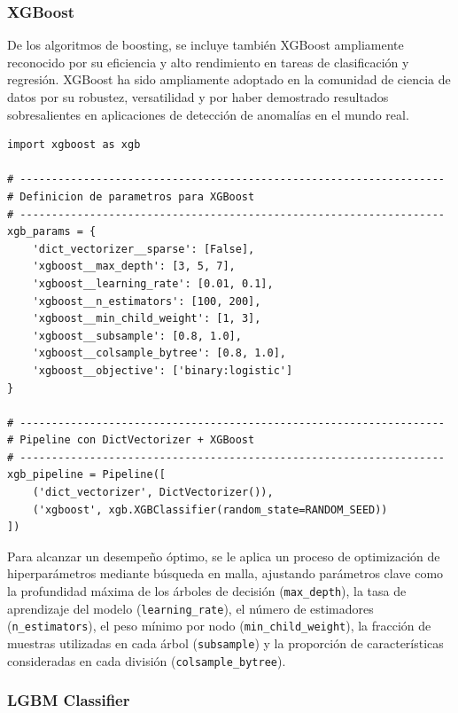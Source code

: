\documentclass[11pt,a4paper,spanish]{book}
\numberwithin{equation}{chapter}
\numberwithin{figure}{chapter}
\begin{document}
\subsubsection{XGBoost}

De los algoritmos de boosting, se incluye también XGBoost ampliamente reconocido por su eficiencia y alto rendimiento en tareas de clasificación y regresión. XGBoost ha sido ampliamente adoptado en la comunidad de ciencia de datos por su robustez, versatilidad y por haber demostrado resultados sobresalientes en aplicaciones de detección de anomalías en el mundo real.


\vspace{5mm}
\begin{lstlisting}
import xgboost as xgb

# -------------------------------------------------------------------
# Definicion de parametros para XGBoost
# -------------------------------------------------------------------
xgb_params = {
    'dict_vectorizer__sparse': [False],
    'xgboost__max_depth': [3, 5, 7],
    'xgboost__learning_rate': [0.01, 0.1],
    'xgboost__n_estimators': [100, 200],
    'xgboost__min_child_weight': [1, 3],
    'xgboost__subsample': [0.8, 1.0],
    'xgboost__colsample_bytree': [0.8, 1.0],
    'xgboost__objective': ['binary:logistic']
}

# -------------------------------------------------------------------
# Pipeline con DictVectorizer + XGBoost
# -------------------------------------------------------------------
xgb_pipeline = Pipeline([
    ('dict_vectorizer', DictVectorizer()),
    ('xgboost', xgb.XGBClassifier(random_state=RANDOM_SEED))
])
\end{lstlisting}

Para alcanzar un desempeño óptimo, se le aplica un proceso de optimización de hiperparámetros mediante búsqueda en malla, ajustando parámetros clave como la profundidad máxima de los árboles de decisión (\lstinline|max_depth|), la tasa de aprendizaje del modelo (\lstinline|learning_rate|), el número de estimadores (\lstinline|n_estimators|), el peso mínimo por nodo (\lstinline|min_child_weight|), la fracción de muestras utilizadas en cada árbol (\lstinline|subsample|) y la proporción de características consideradas en cada división (\lstinline|colsample_bytree|). 


\subsubsection{LGBM Classifier}
\end{document}
